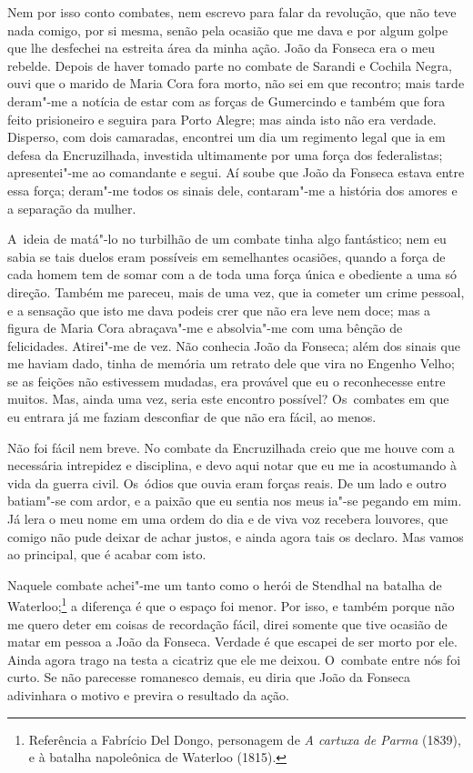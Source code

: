 \begin{linenumbers}
Nem por isso conto combates, nem escrevo para falar da revolução, que
não teve nada comigo, por si mesma, senão pela ocasião que me dava e por
algum golpe que lhe desfechei na estreita área da minha ação. João da
Fonseca era o meu rebelde. Depois de haver tomado parte no combate de
Sarandi e Cochila Negra, ouvi que o marido de Maria Cora fora morto, não
sei em que recontro; mais tarde deram"-me a notícia de estar com as
forças de Gumercindo e também que fora feito prisioneiro e seguira para
Porto Alegre; mas ainda isto não era verdade. Disperso, com dois
camaradas, encontrei um dia um regimento legal que ia em defesa da
Encruzilhada, investida ultimamente por uma força dos federalistas;
apresentei"-me ao comandante e segui. Aí soube que João da Fonseca estava
entre essa força; deram"-me todos os sinais dele, contaram"-me a história
dos amores e a separação da mulher.

A~ideia de matá"-lo no turbilhão de um combate tinha algo fantástico; nem
eu sabia se tais duelos eram possíveis em semelhantes ocasiões, quando a
força de cada homem tem de somar com a de toda uma força única e
obediente a uma só direção. Também me pareceu, mais de uma vez, que ia
cometer um crime pessoal, e a sensação que isto me dava podeis crer que
não era leve nem doce; mas a figura de Maria Cora abraçava"-me e
absolvia"-me com uma bênção de felicidades. Atirei"-me de vez. Não
conhecia João da Fonseca; além dos sinais que me haviam dado, tinha de
memória um retrato dele que vira no Engenho Velho; se as feições não
estivessem mudadas, era provável que eu o reconhecesse entre muitos.
Mas, ainda uma vez, seria este encontro possível? Os~combates em que eu
entrara já me faziam desconfiar de que não era fácil, ao menos.

Não foi fácil nem breve. No combate da Encruzilhada creio que me houve
com a necessária intrepidez e disciplina, e devo aqui notar que eu me ia
acostumando à vida da guerra civil. Os~ódios que ouvia eram forças
reais. De um lado e outro batiam"-se com ardor, e a paixão que eu sentia
nos meus ia"-se pegando em mim. Já lera o meu nome em uma ordem do dia e
de viva voz recebera louvores, que comigo não pude deixar de achar
justos, e ainda agora tais os declaro. Mas vamos ao principal, que é
acabar com isto.

Naquele combate achei"-me um tanto como o herói de Stendhal na batalha de
Waterloo;\footnote{Referência a Fabrício Del Dongo, personagem de \emph{A
  cartuxa de Parma} (1839), e à batalha napoleônica de Waterloo (1815).}
a diferença é que o espaço foi menor. Por isso, e também porque não me
quero deter em coisas de recordação fácil, direi somente que tive
ocasião de matar em pessoa a João da Fonseca. Verdade é que escapei de
ser morto por ele. Ainda agora trago na testa a cicatriz que ele me
deixou. O~combate entre nós foi curto. Se não parecesse romanesco
demais, eu diria que João da Fonseca adivinhara o motivo e previra o
resultado da ação.


\end{linenumbers}
